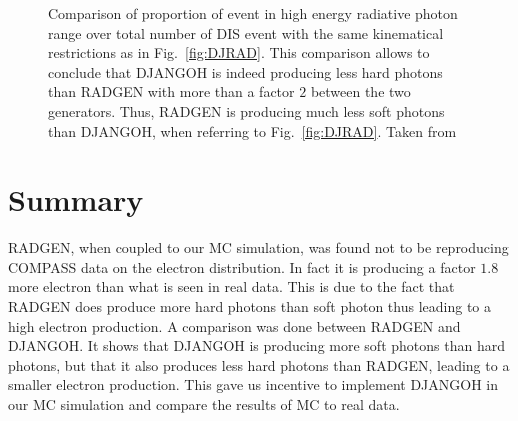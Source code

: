 \begin{figure}[htb]
\centerline{}
\caption{Comparison of proportion of event in high energy radiative photon range over total number of DIS event with the same kinematical restrictions as in Fig.~\ref{fig:DJRAD}. This comparison allows to conclude that DJANGOH is indeed producing less hard photons than RADGEN with more than a factor $2$ between the two generators. Thus, RADGEN is producing much less soft photons than DJANGOH, when referring to Fig.~\ref{fig:DJRAD}. Taken from \cite{DJANGOHnote}}\label{fig:tabDJRAD}
\end{figure}

\newpage


\section{Summary}

RADGEN, when coupled to our MC simulation, was found not to be reproducing COMPASS data on the electron distribution. In fact it is producing a factor $1.8$ more electron than what is seen in real data. This is due to the fact that RADGEN does produce more hard photons than soft photon thus leading to a high electron production. A comparison was done between RADGEN and DJANGOH. It shows that DJANGOH is producing more soft photons than hard photons, but that it also produces less hard photons than RADGEN, leading to a smaller electron production. This gave us incentive to implement DJANGOH in our MC simulation and compare the results of MC to real data.
